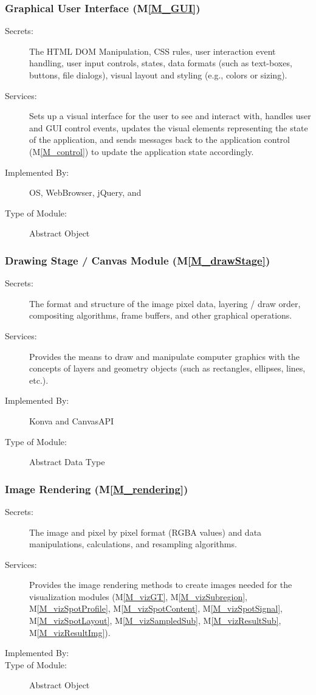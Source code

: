\documentclass[12pt, titlepage]{article}
\newcommand{\mref}[1]{M\ref{#1}}
\begin{document}
\subsubsection{Graphical User Interface (\mref{M_GUI})}
\begin{description}
\item[Secrets:] The HTML DOM Manipulation, CSS rules, user interaction event handling,
  user input controls, states, data formats (such as text-boxes, buttons, file dialogs),
  visual layout and styling (e.g., colors or sizing).
\item[Services:] Sets up a visual interface for the user to see and interact with,
  handles user and GUI control events, updates the visual elements representing the
  state of the application, and sends messages back to the
  application control (\mref{M_control})
  to update the application state accordingly.
\item[Implemented By:] OS, WebBrowser, jQuery, and \progname{}
\item[Type of Module:] Abstract Object
\end{description}


\subsubsection{Drawing Stage / Canvas Module (\mref{M_drawStage})}
\begin{description}
\item[Secrets:] The format and structure of the image pixel data, layering / draw order,
  compositing algorithms, frame buffers, and other graphical operations.
\item[Services:] Provides the means to draw and manipulate computer graphics with the
  concepts of layers and geometry objects (such as rectangles, ellipses, lines, etc.).
\item[Implemented By:] Konva and CanvasAPI
\item[Type of Module:] Abstract Data Type
\end{description}


\subsubsection{Image Rendering (\mref{M_rendering})}
\begin{description}
\item[Secrets:] The image and pixel by pixel format (RGBA values) and data manipulations,
  calculations, and resampling algorithms.
\item[Services:] Provides the image rendering methods to create images needed for
  the visualization modules (\mref{M_vizGT}, \mref{M_vizSubregion},
  \mref{M_vizSpotProfile}, \mref{M_vizSpotContent}, \mref{M_vizSpotSignal},
  \mref{M_vizSpotLayout}, \mref{M_vizSampledSub}, \mref{M_vizResultSub},
  \mref{M_vizResultImg}).
\item[Implemented By:] \progname{}
\item[Type of Module:] Abstract Object
\end{description}
\end{document}

